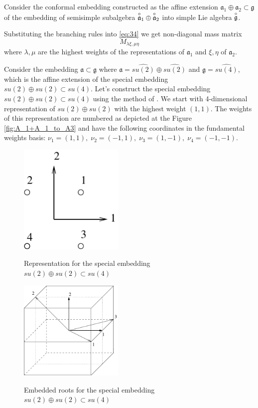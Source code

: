 \documentclass[a4paper,12pt]{article}
\theoremstyle{definition} \newtheorem{Def}{Definition}
\newcommand{\go}{\overset{\circ }{\frak{g}}}
\newcommand{\ao}{\overset{\circ }{\frak{a}}}
\begin{document}
Consider the conformal embedding constructed as the affine extension  $\mathfrak{a}_{1}\oplus\mathfrak{a}_{2}\subset \mathfrak{g}$ of the embedding of semisimple subalgebra $\ao_1\oplus\ao_2$ into simple Lie algebra $\go$.

Substituting the branching rules into \eqref{eq:34} we get non-diagonal mass matrix
\begin{equation}
  \label{eq:2}
  M_{\lambda\xi,\mu\eta}
\end{equation}
where $\lambda,\mu$ are the highest weights of the representations of $\mathfrak{a}_1$ and $\xi,\eta$ of $\mathfrak{a}_2$. 

Consider the embedding $\mathfrak{a}\subset \mathfrak{g}$ where $\mathfrak{a}=\widehat{su(2)}\oplus \widehat{su(2)}$ and $\mathfrak{g}= \widehat{su(4)}$, which is the affine extension of the special embedding $su(2)\oplus su(2)\subset su(4)$. Let's construct the special embedding $su(2)\oplus su(2)\subset su(4)$ using the method of \cite{vasilevich1986method}. We start with 4-dimensional representation of $su(2)\oplus su(2)$ with the highest weight $(1,1)$. The weights of this representation are numbered as depicted at the Figure \ref{fig:A_1+A_1_to_A3} and have the following coordinates in the fundamental weights basis: $\nu_1=(1,1),\; \nu_2=(-1,1),\; \nu_3=(1,-1),\; \nu_4=(-1,-1)$.

\begin{figure}[h!tb]
  \begin{multicols}{2}
    \hfill
    \includegraphics[width=50mm]{A_1+A_1_to_A3.pdf}
    \hfill
    \caption{Representation for the special embedding  $su(2)\oplus su(2)\subset su(4)$}
    \label{fig:A_1+A_1_to_A3}
    \hfill
    \includegraphics[width=50mm]{A1+A1-A3.pdf}
    \hfill
    \caption{Embedded roots for the special embedding  $su(2)\oplus su(2)\subset su(4)$}
    \label{fig:A1+A1-A3}
  \end{multicols}
\end{figure}
\end{document}
